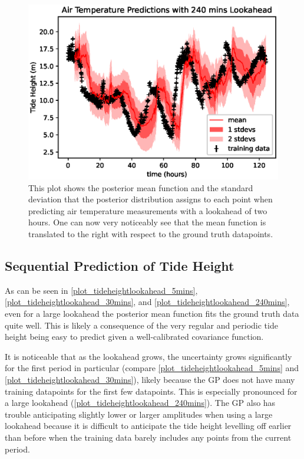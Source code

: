\documentclass{article}
\begin{document}
                \begin{figure}[h!]
                    \includegraphics[width=\linewidth,height=\textheight,keepaspectratio]{air_temp_lookahead_240mins.eps}
                    \caption{This plot shows the posterior mean function and the standard deviation that the posterior distribution assigns to each point when predicting air temperature measurements with a lookahead of two hours. One can now very noticeably see that the mean function is translated to the right with respect to the ground truth datapoints.}
                    \label{plot_airtemplookahead_240mins}
                \end{figure}
            
            \FloatBarrier
            \subsection{Sequential Prediction of Tide Height}

                As can be seen in \cref{plot_tideheightlookahead_5mins}, \cref{plot_tideheightlookahead_30mins}, and \cref{plot_tideheightlookahead_240mins}, even for a large lookahead the posterior mean function fits the ground truth data quite well. This is likely a consequence of the very regular and periodic tide height being easy to predict given a well-calibrated covariance function.

                It is noticeable that as the lookahead grows, the uncertainty grows significantly for the first period in particular (compare \cref{plot_tideheightlookahead_5mins} and \cref{plot_tideheightlookahead_30mins}), likely because the GP does not have many training datapoints for the first few datapoints. This is especially pronounced for a large lookahead (\cref{plot_tideheightlookahead_240mins}).
                The GP also has trouble anticipating slightly lower or larger amplitudes when using a large lookahead because it is difficult to anticipate the tide height levelling off earlier than before when the training data barely includes any points from the current period.
\end{document}
